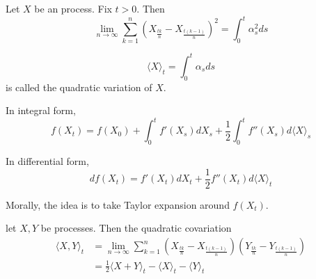 \begin{thm}
  \label{defn:continuous_time:12}
  Let $X$ be an \ito process.  Fix $t > 0$.  Then
  \begin{equation}
    \label{eq:40}
    \lim_{n \rightarrow \infty} \sum_{k=1}^{n} \left(X_{\frac{tk}{n}}
      - X_{\frac{t(k-1)}{n}}\right)^{2} = \int_{0}^{t} \alpha_{s}^{2} ds
  \end{equation}
\end{thm}

\begin{notation}
  \begin{equation}
    \label{eq:41}
    \langle X \rangle_{t} = \int_{0}^{t} \alpha_{s} ds
  \end{equation} is called the quadratic variation of $X$.
\end{notation}

\begin{thm}
  \label{defn:continuous_time:13}
  In integral form,
  \begin{equation}
    \label{eq:42}
    f(X_{t}) = f(X_{0}) + \int_{0}^{t} f'(X_{s}) dX_{s} + \frac{1}{2}
    \int_{0}^{t} f''(X_{s}) d \langle X \rangle_{s}
  \end{equation}

  In differential form,
  \begin{equation}
    \label{eq:43}
    df(X_{t}) = f'(X_{t}) dX_{t} + \frac{1}{2} f''(X_{t}) d\langle X \rangle_{t}
  \end{equation}
\end{thm}

Morally, the idea is to take Taylor expansion around $f(X_{t})$.

\begin{thm}
  \label{defn:continuous_time:14}
  let $X, Y$ be \ito processes. Then the quadratic covariation
  \begin{align}
    \label{eq:44}
    \langle X, Y \rangle_{t} &= \lim_{n \rightarrow \infty}
    \sum_{k=1}^{n} (X_{\frac{tk}{n}} -
    X_{\frac{t(k-1)}{n}})(Y_{\frac{tk}{n}} -
    Y_{\frac{t(k-1)}{n}}) \\
    &= \frac{1}{2} \langle X + Y \rangle_{t} - \langle X \rangle_{t} -
    \langle Y \rangle_{t}
  \end{align}
\end{thm}

